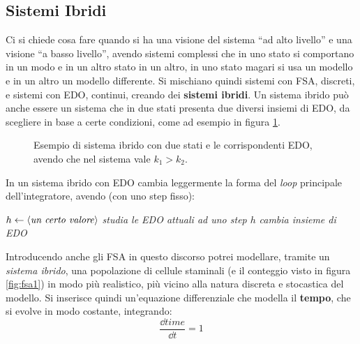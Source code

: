 \documentclass[a4paper,12pt, oneside]{book}
\begin{document}
\subsection{Sistemi Ibridi}
Ci si chiede cosa fare quando si ha una visione del sistema ``ad alto livello''
e una visione ``a basso livello'', avendo sistemi complessi che in uno stato si
comportano in un modo e in un altro stato in un altro, in uno stato magari si
usa un modello e in un altro un modello differente. Si mischiano quindi sistemi
con FSA, discreti, e sistemi con EDO, continui, creando dei \textbf{sistemi
  ibridi}. Un sistema ibrido può anche essere un sistema che in due stati
presenta due diversi insiemi di EDO, da scegliere in base a certe condizioni,
come ad esempio in figura \ref{fig:hyb}.\\
\begin{figure}
  \centering
  \caption{Esempio di sistema ibrido con due stati e le corrispondenti EDO,
    avendo che nel sistema vale $k_1>k_2$.}
  \label{fig:hyb}
\end{figure}
In un sistema ibrido con EDO cambia leggermente la forma del \textit{loop}
principale dell'integratore, avendo (con uno step fisso): 
\begin{algorithm}[H]
  \begin{algorithmic}
    \State $h\gets \langle\mbox{\textit{un certo valore}}\rangle$
    \State \textit{studia le EDO attuali ad uno step $h$}
    \State \textit{cambia insieme di EDO}
    \EndIf
    \EndFor
  \end{algorithmic}
\end{algorithm}
Introducendo anche gli FSA in questo discorso potrei modellare, tramite un
\textit{sistema ibrido}, una popolazione di cellule staminali (e il conteggio
visto in figura \ref{fig:fsa1}) in modo più
realistico, più vicino alla natura discreta e stocastica del modello. Si
inserisce quindi un'equazione differenziale che modella il \textbf{tempo}, che
si evolve in modo costante, integrando:
\[\frac{\dd{time}}{\dd{t}}=1\]
\end{document}
